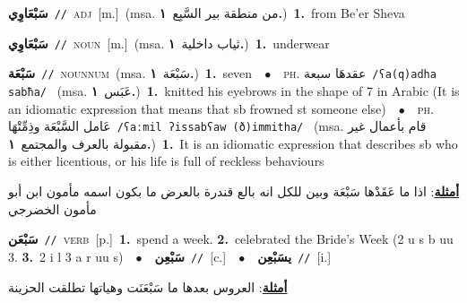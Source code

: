 \documentclass[10pt,a4paper,twoside]{article} %
\begin{document}
\begin{multicols}{2}
{\setlength\topsep{0pt}\textbf{\foreignlanguage{arabic}{سَبْعَاوِي}}\ {\color{gray}\texttt{//}\color{black}}\ \textsc{adj}\ [m.]\ \color{gray}(msa. \foreignlanguage{arabic}{من منطقة بير السَّبِع}~\foreignlanguage{arabic}{\textbf{١.}})\color{black}\ \textbf{1.}~from Be'er Sheva\ } \vspace{2mm}

{\setlength\topsep{0pt}\textbf{\foreignlanguage{arabic}{سَبْعَاوِي}}\ {\color{gray}\texttt{//}\color{black}}\ \textsc{noun}\ [m.]\ \color{gray}(msa. \foreignlanguage{arabic}{ثياب داخلية}~\foreignlanguage{arabic}{\textbf{١.}})\color{black}\ \textbf{1.}~underwear\ } \vspace{2mm}

{\setlength\topsep{0pt}\textbf{\foreignlanguage{arabic}{سَبْعَة}}\ {\color{gray}\texttt{//}\color{black}}\ \textsc{noun\textunderscore num}\ \color{gray}(msa. \foreignlanguage{arabic}{سَبْعَة}~\foreignlanguage{arabic}{\textbf{١.}})\color{black}\ \textbf{1.}~seven\ \ $\bullet$\ \ \textsc{ph.} \color{gray} \foreignlanguage{arabic}{عقدهَا سبعة}\color{black}\ {\color{gray}\texttt{/{\sffamily ʕa(q)adha sabħa}/}\color{black}}\ \color{gray} (msa. \foreignlanguage{arabic}{عَبَس}~\foreignlanguage{arabic}{\textbf{١.}})\color{black}\ \textbf{1.}~knitted his eyebrows in the shape of 7 in Arabic (It is an idiomatic expression that means that sb frowned st someone else)\ \ $\bullet$\ \ \textsc{ph.} \color{gray} \foreignlanguage{arabic}{عَامل السَّبْعَة وذِمِّتْهَا}\color{black}\ {\color{gray}\texttt{/{\sffamily ʕaːmil ʔissabʕaw (ð)immitha}/}\color{black}}\ \color{gray} (msa. \foreignlanguage{arabic}{قام بأعمال غير مقبولة بالعرف والمجتمع}~\foreignlanguage{arabic}{\textbf{١.}})\color{black}\ \textbf{1.}~It is an idiomatic expression that describes sb who is either licentious, or his life is full of reckless behaviours\  \begin{flushright}\color{gray}\foreignlanguage{arabic}{\textbf{\underline{\foreignlanguage{arabic}{أمثلة}}}: اذا ما عَقَدْها سَبْعَة وبين للكل انه بالع قندرة بالعرض ما بكون اسمه مأمون ابن أبو مأمون الخضرجي}\end{flushright}\color{black}} \vspace{2mm}

{\setlength\topsep{0pt}\textbf{\foreignlanguage{arabic}{سَبْعَن}}\ {\color{gray}\texttt{//}\color{black}}\ \textsc{verb}\ [p.]\ \textbf{1.}~spend a week.  \textbf{2.}~celebrated the Bride's Week (2 u s b uu 3.  \textbf{3.}~2 i l 3 a r uu s)\ \ $\bullet$\ \ \setlength\topsep{0pt}\textbf{\foreignlanguage{arabic}{سَبْعِن}}\ {\color{gray}\texttt{//}\color{black}}\ [c.]\ \ $\bullet$\ \ \setlength\topsep{0pt}\textbf{\foreignlanguage{arabic}{يسَبْعِن}}\ {\color{gray}\texttt{//}\color{black}}\ [i.]\  \begin{flushright}\color{gray}\foreignlanguage{arabic}{\textbf{\underline{\foreignlanguage{arabic}{أمثلة}}}: العروس بعدها ما سَبْعَنَت وهياتها تطلقت الحزينة}\end{flushright}\color{black}} \vspace{2mm}


\end{multicols}
\end{document}
